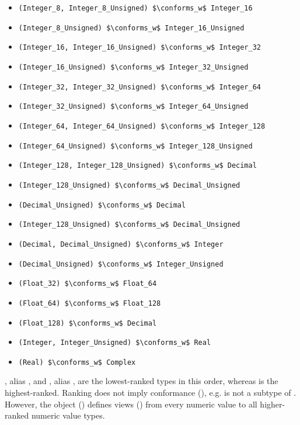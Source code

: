 \begin{itemize}
\item \lstinline!(Integer_8, Integer_8_Unsigned) $\conforms_w$ Integer_16!
\item \lstinline!(Integer_8_Unsigned) $\conforms_w$ Integer_16_Unsigned!

\item \lstinline!(Integer_16, Integer_16_Unsigned) $\conforms_w$ Integer_32!
\item \lstinline!(Integer_16_Unsigned) $\conforms_w$ Integer_32_Unsigned!

\item \lstinline!(Integer_32, Integer_32_Unsigned) $\conforms_w$ Integer_64!
\item \lstinline!(Integer_32_Unsigned) $\conforms_w$ Integer_64_Unsigned!

\item \lstinline!(Integer_64, Integer_64_Unsigned) $\conforms_w$ Integer_128!
\item \lstinline!(Integer_64_Unsigned) $\conforms_w$ Integer_128_Unsigned!

\item \lstinline!(Integer_128, Integer_128_Unsigned) $\conforms_w$ Decimal!
\item \lstinline!(Integer_128_Unsigned) $\conforms_w$ Decimal_Unsigned!

\item \lstinline!(Decimal_Unsigned) $\conforms_w$ Decimal!
\item \lstinline!(Integer_128_Unsigned) $\conforms_w$ Decimal_Unsigned!

\item \lstinline!(Decimal, Decimal_Unsigned) $\conforms_w$ Integer!
\item \lstinline!(Decimal_Unsigned) $\conforms_w$ Integer_Unsigned!

\item \lstinline!(Float_32) $\conforms_w$ Float_64!
\item \lstinline!(Float_64) $\conforms_w$ Float_128!
\item \lstinline!(Float_128) $\conforms_w$ Decimal!

\item \lstinline!(Integer, Integer_Unsigned) $\conforms_w$ Real!
\item \lstinline!(Real) $\conforms_w$ Complex!
\end{itemize}

, alias , and , alias , are the lowest-ranked types in this order, whereas  is the highest-ranked. Ranking does not imply conformance (), e.g.  is not a subtype of . However, the object  () defines views () from every numeric value to all higher-ranked numeric value types. 

